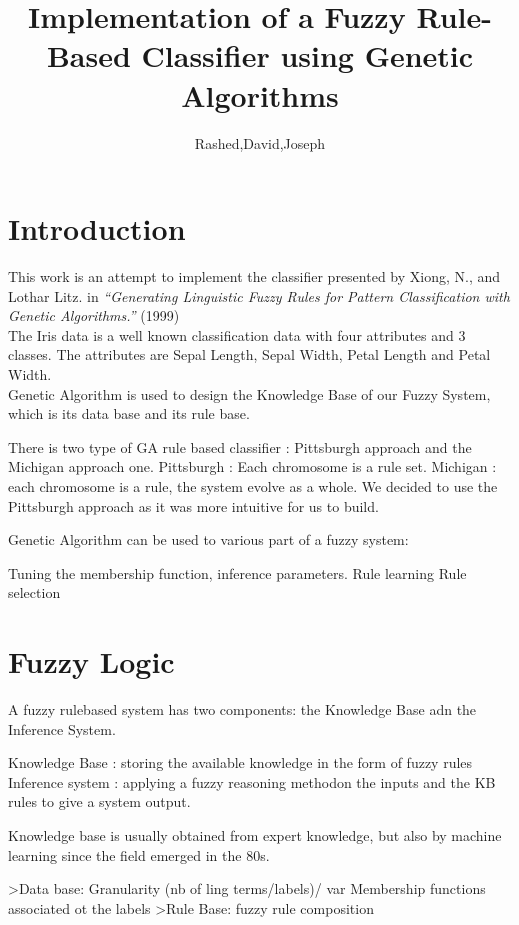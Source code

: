 \documentclass[a4paper,12pt]{article}
\begin{document}
\title{Implementation of a Fuzzy Rule-Based Classifier using Genetic Algorithms}
\author{Rashed,David,Joseph}
\maketitle

\section{Introduction}
This work is an attempt to implement the classifier presented by Xiong, N., and Lothar Litz. in \textit{“Generating Linguistic Fuzzy Rules for Pattern Classification with Genetic Algorithms.”} (1999) \\
The Iris data is a well known classification data with four attributes and 3 classes. The attributes are Sepal Length, Sepal Width, Petal Length and Petal Width. \\


Genetic Algorithm is used to design the Knowledge Base of our Fuzzy System, which is its data base and its rule base.


There is two type of GA rule based classifier : Pittsburgh approach and the Michigan approach one. Pittsburgh : Each chromosome is a rule set. Michigan : each chromosome is a rule, the system evolve as a whole. We decided to use the Pittsburgh approach as it was more intuitive for us to build.


Genetic Algorithm can be used to various part of a fuzzy system:

Tuning the membership function, inference parameters.
Rule learning
Rule selection



\section{Fuzzy Logic}

A fuzzy rulebased system has two components: the Knowledge Base adn the Inference System.

Knowledge Base : storing the available knowledge in the form of fuzzy rules
Inference system : applying a fuzzy reasoning methodon the inputs and the KB rules to give a system output.


Knowledge base is usually obtained from expert knowledge, but also by machine learning since the field emerged in the 80s.

>Data base:
Granularity (nb of ling terms/labels)/ var
Membership functions associated ot the labels
>Rule Base: fuzzy rule composition
\end{document}
